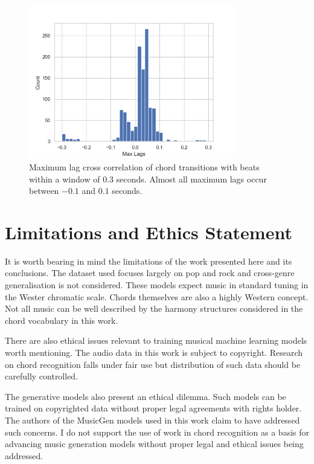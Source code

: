 \begin{figure}[H]
    \centering
    \includegraphics[width=0.8\textwidth]{figures/beats_max_lags.png}
    \caption{Maximum lag cross correlation of chord transitions with beats within a window of $0.3$ seconds. Almost all maximum lags occur between $-0.1$ and $0.1$ seconds.}\label{fig:maximum_lag_cross_correlation}
\end{figure}

\section{Limitations and Ethics Statement}\label{app:limitations_and_ethics}

It is worth bearing in mind the limitations of the work presented here and its conclusions. The dataset used focuses largely on pop and rock and cross-genre generalisation is not considered. These models expect music in standard tuning in the Wester chromatic scale. Chords themselves are also a highly Western concept. Not all music can be well described by the harmony structures considered in the chord vocabulary in this work. 

There are also ethical issues relevant to training musical machine learning models worth mentioning. The audio data in this work is subject to copyright. Research on chord recognition falls under fair use but distribution of such data should be carefully controlled. 

The generative models also present an ethical dilemma. Such models can be trained on copyrighted data without proper legal agreements with rights holder. The authors of the MusicGen models used in this work claim to have addressed such concerns. I do not support the use of work in chord recognition as a basis for advancing music generation models without proper legal and ethical issues being addressed.